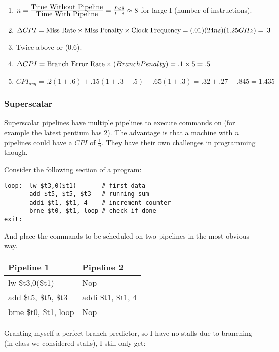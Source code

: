 {\color{ans}

\begin{enumerate}
\item $n=\frac{\hbox{Time Without Pipeline}}{\hbox{Time With Pipeline}}=\frac{I\times 8}{I+8}\approx 8$ for large I (number of instructions).
\item $\Delta CPI=\hbox{Miss Rate}\times\hbox{Miss Penalty}\times\hbox{Clock Frequency}=(.01)(24 ns)(1.25 GHz)=.3$
\item Twice above or (0.6).
\item $\Delta CPI = \hbox{Branch Error Rate}\times(Branch Penalty)=.1 \times 5 = .5$
\item $CPI_{avg}=.2(1+.6)+.15(1+.3+.5)+.65(1+.3)=.32+.27+.845=1.435$
\end{enumerate}
}



\subsubsection{Superscalar}

Superscalar pipelines have multiple pipelines to execute commands on (for example the latest pentium has 2).  The advantage is that a machine with $n$ pipelines could have a $CPI$ of $\frac{1}{n}$.  They have their own challenges in programming though.

Consider the following section of a program:

\begin{verbatim}
loop:  lw $t3,0($t1)       # first data
       add $t5, $t5, $t3   # running sum
       addi $t1, $t1, 4    # increment counter
       brne $t0, $t1, loop # check if done
exit:
\end{verbatim}

And place the commands to be scheduled on two pipelines in the most obvious way.

\vspace{3pt}
\begin{tabular}{l|l}
  Pipeline 1 & Pipeline 2 \\
  \hline
  lw \$t3,0(\$t1) & Nop \\
  add \$t5, \$t5, \$t3 & addi \$t1, \$t1, 4 \\
  brne \$t0, \$t1, loop & Nop \\
\end{tabular}
\vspace{3pt}

Granting myself a perfect branch predictor, so I have no stalls due to branching (in class we considered stalls), I still only get:

